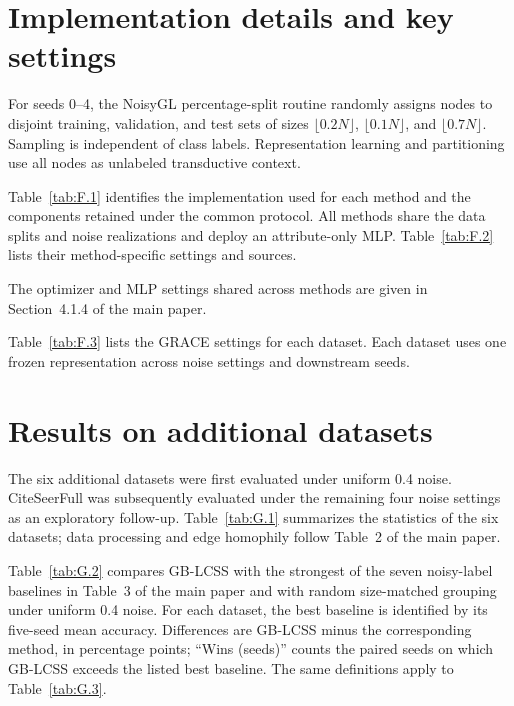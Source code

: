 \documentclass[a4paper,fleqn]{cas-sc}
\begin{document}

\setcounter{table}{0}

\section{Implementation details and key settings}\label{sec:F}

For seeds 0--4, the NoisyGL percentage-split routine randomly assigns nodes to disjoint training, validation, and test sets of sizes \(\lfloor 0.2N\rfloor\), \(\lfloor 0.1N\rfloor\), and \(\lfloor 0.7N\rfloor\). Sampling is independent of class labels. Representation learning and partitioning use all nodes as unlabeled transductive context.

Table~\ref{tab:F.1} identifies the implementation used for each method and the components retained under the common protocol. All methods share the data splits and noise realizations and deploy an attribute-only MLP. Table~\ref{tab:F.2} lists their method-specific settings and sources.



The optimizer and MLP settings shared across methods are given in Section~4.1.4 of the main paper.



Table~\ref{tab:F.3} lists the GRACE settings for each dataset. Each dataset uses one frozen representation across noise settings and downstream seeds.


\setcounter{table}{0}

\section{Results on additional datasets}\label{sec:G}

The six additional datasets were first evaluated under uniform 0.4 noise. CiteSeerFull was subsequently evaluated under the remaining four noise settings as an exploratory follow-up. Table~\ref{tab:G.1} summarizes the statistics of the six datasets; data processing and edge homophily follow Table~2 of the main paper.



Table~\ref{tab:G.2} compares GB-LCSS with the strongest of the seven noisy-label baselines in Table~3 of the main paper and with random size-matched grouping under uniform 0.4 noise. For each dataset, the best baseline is identified by its five-seed mean accuracy. Differences are GB-LCSS minus the corresponding method, in percentage points; ``Wins (seeds)'' counts the paired seeds on which GB-LCSS exceeds the listed best baseline. The same definitions apply to Table~\ref{tab:G.3}.
\end{document}
